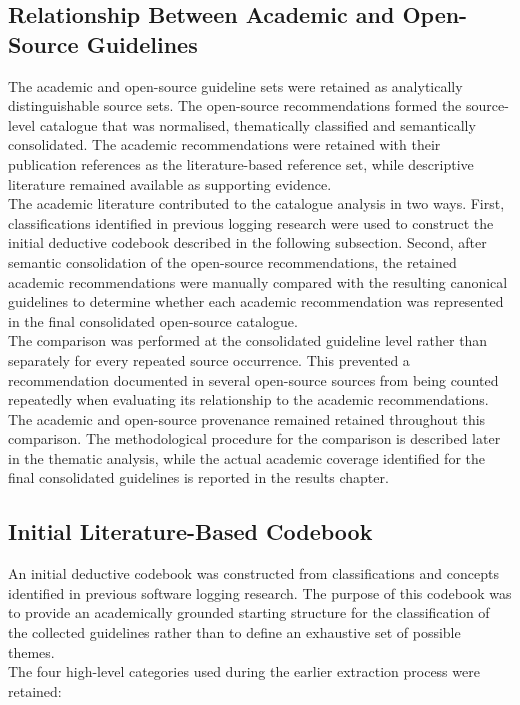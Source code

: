 \subsection{Relationship Between Academic and Open-Source Guidelines}

The academic and open-source guideline sets were retained as analytically distinguishable
source sets. The open-source recommendations formed the source-level catalogue that was
normalised, thematically classified and semantically consolidated. The academic
recommendations were retained with their publication references as the literature-based
reference set, while descriptive literature remained available as supporting evidence.
\\
The academic literature contributed to the catalogue analysis in two ways. First,
classifications identified in previous logging research were used to construct the
initial deductive codebook described in the following subsection. Second, after semantic
consolidation of the open-source recommendations, the retained academic recommendations
were manually compared with the resulting canonical guidelines to determine whether each
academic recommendation was represented in the final consolidated open-source catalogue.
\\
The comparison was performed at the consolidated guideline level rather than separately
for every repeated source occurrence. This prevented a recommendation documented in
several open-source sources from being counted repeatedly when evaluating its relationship
to the academic recommendations.
\\
The academic and open-source provenance remained retained throughout this comparison.
The methodological procedure for the comparison is described later in the thematic
analysis, while the actual academic coverage identified for the final consolidated
guidelines is reported in the results chapter.

\subsection{Initial Literature-Based Codebook}

An initial deductive codebook was constructed from classifications and concepts
identified in previous software logging research. The purpose of this codebook was
to provide an academically grounded starting structure for the classification of the
collected guidelines rather than to define an exhaustive set of possible themes.
\\
The four high-level categories used during the earlier extraction process were
retained:

